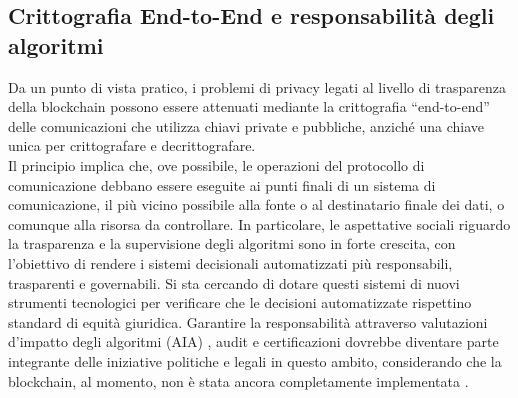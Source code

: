 \subsection{Crittografia End-to-End e responsabilità degli algoritmi}
Da un punto di vista pratico, i problemi di privacy legati al livello di trasparenza della blockchain possono essere attenuati mediante la crittografia “end-to-end” delle comunicazioni che utilizza chiavi private e pubbliche, anziché una chiave unica per crittografare e decrittografare.
\\Il principio implica che, ove possibile, le operazioni del protocollo di comunicazione debbano essere eseguite ai punti finali di un sistema di comunicazione, il più vicino possibile alla fonte o al destinatario finale dei dati, o comunque alla risorsa da controllare.
In particolare, le aspettative sociali riguardo la trasparenza e la supervisione degli algoritmi sono in forte crescita, con l’obiettivo di rendere i sistemi decisionali automatizzati più responsabili, trasparenti e governabili. Si sta cercando di dotare questi sistemi di nuovi strumenti tecnologici per verificare che le decisioni automatizzate rispettino standard di equità giuridica. 
Garantire la responsabilità attraverso valutazioni d’impatto degli algoritmi (AIA) \cite{reisman_algorithmic_2018}, audit e certificazioni dovrebbe diventare parte integrante delle iniziative politiche e legali in questo ambito, considerando che la blockchain, al momento, non è stata ancora completamente implementata \cite{zhang_end_to_end_3}.
\\
\\
\\
